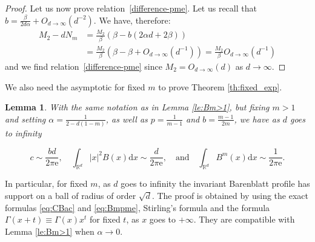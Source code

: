 \documentclass[10pt,reqno]{amsart}
\numberwithin{equation}{section}
\newtheorem{lemma}[theorem]{Lemma}%
\begin{document}
\begin{proof}
Let us now prove relation~\eqref{difference-pme}. Let us recall that $b=\frac{\beta}{2d\alpha}+O_{d\to\infty}(d^{-2})$. We have, therefore: 
\begin{equation}
\begin{split}
M_2-dN_m& =\frac{M_2}{\beta}\left(\beta-b(2\alpha d+2\beta)\right) \\
& = \frac{M_2}{\beta} \left(\beta - \beta + O_{d\to\infty}(d^{-1})\right)= \frac{M_2}{\beta}O_{d\to\infty}(d^{-1})
\end{split}
\end{equation}
and we find relation~\eqref{difference-pme} since $M_2=O_{d\to\infty}(d)$ as $d\to\infty$.
\end{proof}

We also need the asymptotic for fixed $m$ to prove Theorem \ref{th:fixed_exp}. 

\begin{lemma} \label{lem:fixed.m}
    With the same notation as in Lemma \ref{le:Bm>1}, but fixing $m > 1$ and setting $\alpha = \frac{1}{2-d(1-m)}$, as well as $p=\frac{1}{m-1}$ and $b =\frac{m-1}{2m}$, we have as $d$ goes to infinity

    \begin{equation}
    c \sim \frac{bd}{2\pi\mathrm{e}},\quad
    \int_{\mathbb{R}^d}|x|^2B(x)\mathrm{d}x \sim \frac{d}{2\pi\mathrm{e}},\quad\text{and}\quad
    \int_{\mathbb{R}^d}B^m(x)\mathrm{d}x \sim \frac{1}{2\pi\mathrm{e}}.
    \end{equation}
\end{lemma}
In particular, for fixed $m$, as $d$ goes to infinity the invariant Barenblatt profile has support on a ball of radius of order $\sqrt{d}$. The proof is obtained by using the exact formulas \eqref{eq:CBac} and \eqref{eq:Bmpme}, Stirling's formula and the formula $\Gamma(x+t) \equiv \Gamma(x)x^t$ for fixed $t$, as $x$ goes to $+\infty$. They are compatible with Lemma \ref{le:Bm>1} when $\alpha \rightarrow 0$.
\end{document}
